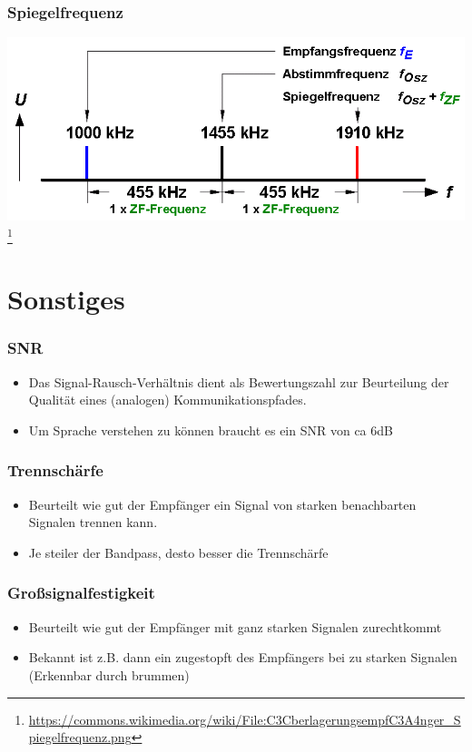 \begin{frame}
    \frametitle{Spiegelfrequenz}
    \begin{center}
        \includegraphics[width=.99\textwidth]{e15/Uberlagerungsempfanger_Spiegelfrequenz.png}
        \footnote{\tiny \url{https://commons.wikimedia.org/wiki/File:C3CberlagerungsempfC3A4nger_Spiegelfrequenz.png}}
	\end{center}
\end{frame}

\section*{Sonstiges}
\begin{frame}
    \frametitle{SNR}
    \begin{itemize}
		\item Das Signal-Rausch-Verhältnis dient als Bewertungszahl zur Beurteilung der Qualität eines (analogen) Kommunikationspfades.
		\item Um Sprache verstehen zu können braucht es ein SNR von ca 6dB
    \end{itemize}
\end{frame}

\begin{frame}
    \frametitle{Trennschärfe}
    \begin{itemize}
		\item Beurteilt wie gut der Empfänger ein Signal von starken benachbarten Signalen trennen kann.
		\item Je steiler der Bandpass, desto besser die Trennschärfe
    \end{itemize}
\end{frame}

\begin{frame}
    \frametitle{Großsignalfestigkeit}
    \begin{itemize}
		\item Beurteilt wie gut der Empfänger mit ganz starken Signalen zurechtkommt
		\item Bekannt ist z.B. dann ein zugestopft des Empfängers bei zu starken Signalen (Erkennbar durch brummen)
    \end{itemize}
\end{frame}


